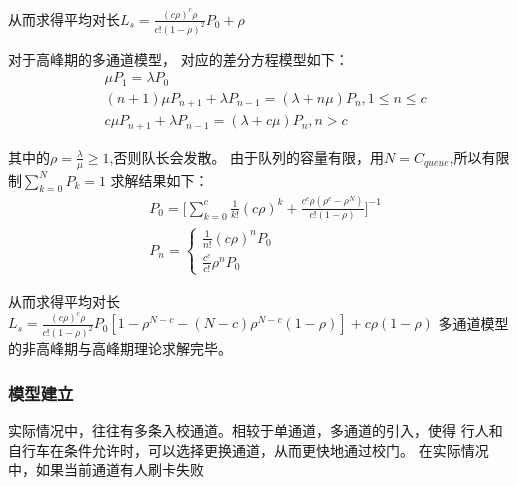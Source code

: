 从而求得平均对长$L_s=\frac{(c\rho)^c\rho}{c!(1-\rho)^2}P_0+\rho$

对于高峰期的多通道模型，
对应的差分方程模型如下：
\begin{equation}
    \begin{aligned}
        &\mu P_1=\lambda P_0 \\
        &(n+1)\mu P_{n+1}+\lambda P_{n-1}=(\lambda+n\mu)P_n, 1\leq n\leq c \\
        &c\mu P_{n+1}+\lambda P_{n-1}=(\lambda +c\mu )P_n, n>c
    \end{aligned}
\end{equation}

其中的$\rho=\frac{\lambda}{\mu}\geq 1$,否则队长会发散。
由于队列的容量有限，用$N=C_{queue}$,所以有限制$\sum_{k=0}^{N}P_k=1$
求解结果如下：
\begin{equation}
    \begin{aligned}
        &P_0=\Big[\sum_{k=0}^{c}\frac{1}{k!} (c\rho)^k +\frac{c^c\rho (\rho^c-\rho^N)}{c!(1-\rho)} \Big]^{-1} \\
        &P_n=
        \begin{cases}
            \frac{1}{n!}(c\rho)^n P_0 \\
            \frac{c^c}{c!}\rho^n P_0
        \end{cases}
    \end{aligned}
\end{equation}

从而求得平均对长$L_s=\frac{(c\rho)^c\rho}{c!(1-\rho)^2}P_0[1-\rho^{N-c}-(N-c)\rho^{N-c}(1-\rho)]+c\rho (1-\rho)$
多通道模型的非高峰期与高峰期理论求解完毕。

\subsubsection{模型建立}
\par 实际情况中，往往有多条入校通道。相较于单通道，多通道的引入，使得
行人和自行车在条件允许时，可以选择更换通道，从而更快地通过校门。
在实际情况中，如果当前通道有人刷卡失败


